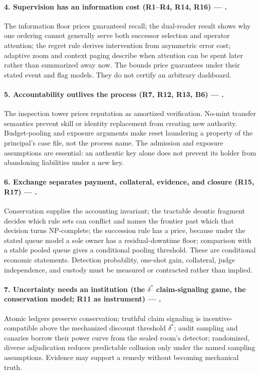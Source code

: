 \paragraph{4. Supervision has an information cost (R1--R4, R14, R16) --- .}
The information floor prices guaranteed recall; the dual-reader result shows why
one ordering cannot generally serve both successor selection and operator
attention; the regret rule derives intervention from asymmetric error cost;
adaptive zoom and context paging describe when attention can be spent later
rather than summarized away now. The bounds price guarantees under their stated
event and flag models. They do not certify an arbitrary dashboard.

\paragraph{5. Accountability outlives the process (R7, R12, R13, B6) --- .}
The inspection tower prices reputation as amortized verification. No-mint transfer semantics prevent skill or identity replacement from creating
new authority. Budget-pooling and exposure arguments make reset laundering a
property of the principal's case file, not the process name. The admission and exposure assumptions are essential: an authentic key alone
does not prevent its holder from abandoning liabilities under a new key.

\paragraph{6. Exchange separates payment, collateral, evidence, and closure
(R15, R17) --- .}
Conservation supplies the accounting invariant; the tractable deontic fragment
decides which rule sets can conflict and names the frontier past which that
decision turns NP-complete; the succession rule has a price, because under the stated queue model a sole
owner has a residual-downtime floor; comparison with a stable pooled queue
gives a conditional pooling threshold. These are conditional economic
statements. Detection probability, one-shot gain, collateral, judge
independence, and custody must be measured or contracted rather than implied.

\paragraph{7. Uncertainty needs an institution (the $\delta^{*}$ claim-signaling
game, the conservation model; R11 as instrument) --- .}
Atomic ledgers preserve conservation; truthful claim signaling is
incentive-compatible above the mechanized discount threshold $\delta^{*}$;
audit sampling and canaries borrow their power curve from the sealed room's
detector; randomized, diverse adjudication reduces predictable collusion only
under the named sampling assumptions. Evidence may support a remedy without
becoming mechanical truth.

